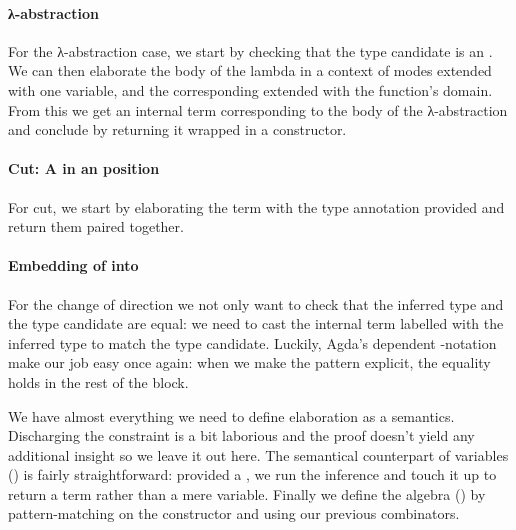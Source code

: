 \paragraph{λ-abstraction} For the λ-abstraction case, we start by
checking that the type candidate  is an . We can
then elaborate the body  of the lambda in a context of modes extended
with one  variable, and the corresponding  extended
with the function's domain. From this we get
an internal term  corresponding to the body of the λ-abstraction and
conclude by returning it wrapped in a  constructor.
\begin{agdasnippet}
\end{agdasnippet}
\paragraph{Cut: A  in an  position} For cut, we start by
elaborating the term with the type annotation provided and return them paired
together.
\begin{agdasnippet}
\end{agdasnippet}
\paragraph{Embedding of  into } For the change of direction
 we not only want to check that the inferred type and the type candidate
are equal: we need to cast the internal term labelled with the inferred type to
match the type candidate. Luckily, Agda's dependent -notation make our
job easy once again: when we make the pattern  explicit, the equality holds
in the rest of the block.
\begin{agdasnippet}
\end{agdasnippet}

We have almost everything we need to define elaboration as a semantics. Discharging
the  constraint is a bit laborious and the proof doesn't
yield any additional insight so we leave it out here. The semantical counterpart of
variables () is fairly straightforward: provided a , we run the
inference and touch it up to return a term rather than a mere variable. Finally we
define the algebra () by pattern-matching on the constructor and using our
previous combinators.

